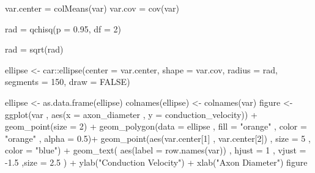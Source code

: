\documentclass[
]{article}
\newenvironment{Shaded}{\begin{snugshade}}{\end{snugshade}}
\newcommand{\AttributeTok}[1]{\textcolor[rgb]{0.77,0.63,0.00}{#1}}
\newcommand{\ConstantTok}[1]{\textcolor[rgb]{0.00,0.00,0.00}{#1}}
\newcommand{\DecValTok}[1]{\textcolor[rgb]{0.00,0.00,0.81}{#1}}
\newcommand{\FloatTok}[1]{\textcolor[rgb]{0.00,0.00,0.81}{#1}}
\newcommand{\FunctionTok}[1]{\textcolor[rgb]{0.00,0.00,0.00}{#1}}
\newcommand{\NormalTok}[1]{#1}
\newcommand{\OtherTok}[1]{\textcolor[rgb]{0.56,0.35,0.01}{#1}}
\newcommand{\SpecialCharTok}[1]{\textcolor[rgb]{0.00,0.00,0.00}{#1}}
\newcommand{\StringTok}[1]{\textcolor[rgb]{0.31,0.60,0.02}{#1}}
\begin{document}
\begin{Shaded}
\begin{Highlighting}[]
\NormalTok{var.center }\OtherTok{=} \FunctionTok{colMeans}\NormalTok{(var)}
\NormalTok{var.cov }\OtherTok{=} \FunctionTok{cov}\NormalTok{(var)}

\NormalTok{rad }\OtherTok{=} \FunctionTok{qchisq}\NormalTok{(}\AttributeTok{p =} \FloatTok{0.95}\NormalTok{, }\AttributeTok{df =} \DecValTok{2}\NormalTok{)}

\NormalTok{rad }\OtherTok{=} \FunctionTok{sqrt}\NormalTok{(rad)}

\NormalTok{ellipse }\OtherTok{\textless{}{-}}\NormalTok{ car}\SpecialCharTok{::}\FunctionTok{ellipse}\NormalTok{(}\AttributeTok{center =}\NormalTok{ var.center, }\AttributeTok{shape =}\NormalTok{ var.cov, }\AttributeTok{radius =}\NormalTok{ rad, }\AttributeTok{segments =} \DecValTok{150}\NormalTok{, }\AttributeTok{draw =} \ConstantTok{FALSE}\NormalTok{)}

\NormalTok{ellipse }\OtherTok{\textless{}{-}} \FunctionTok{as.data.frame}\NormalTok{(ellipse)}
\FunctionTok{colnames}\NormalTok{(ellipse) }\OtherTok{\textless{}{-}} \FunctionTok{colnames}\NormalTok{(var)}
\NormalTok{figure }\OtherTok{\textless{}{-}} \FunctionTok{ggplot}\NormalTok{(var , }\FunctionTok{aes}\NormalTok{(}\AttributeTok{x =}\NormalTok{ axon\_diameter , }\AttributeTok{y =}\NormalTok{ conduction\_velocity)) }\SpecialCharTok{+}
       \FunctionTok{geom\_point}\NormalTok{(}\AttributeTok{size =} \DecValTok{2}\NormalTok{) }\SpecialCharTok{+}
       \FunctionTok{geom\_polygon}\NormalTok{(}\AttributeTok{data =}\NormalTok{ ellipse , }\AttributeTok{fill =} \StringTok{"orange"}\NormalTok{ , }\AttributeTok{color =} \StringTok{"orange"}\NormalTok{ , }\AttributeTok{alpha =} \FloatTok{0.5}\NormalTok{)}\SpecialCharTok{+}
       \FunctionTok{geom\_point}\NormalTok{(}\FunctionTok{aes}\NormalTok{(var.center[}\DecValTok{1}\NormalTok{] , var.center[}\DecValTok{2}\NormalTok{]) , }\AttributeTok{size =} \DecValTok{5}\NormalTok{ , }\AttributeTok{color =} \StringTok{"blue"}\NormalTok{) }\SpecialCharTok{+}
       \FunctionTok{geom\_text}\NormalTok{( }\FunctionTok{aes}\NormalTok{(}\AttributeTok{label =} \FunctionTok{row.names}\NormalTok{(var)) , }\AttributeTok{hjust =} \DecValTok{1}\NormalTok{ , }\AttributeTok{vjust =} \SpecialCharTok{{-}}\FloatTok{1.5}\NormalTok{ ,}\AttributeTok{size =} \FloatTok{2.5}\NormalTok{ ) }\SpecialCharTok{+}
       \FunctionTok{ylab}\NormalTok{(}\StringTok{"Conduction Velocity"}\NormalTok{) }\SpecialCharTok{+} \FunctionTok{xlab}\NormalTok{(}\StringTok{"Axon Diameter"}\NormalTok{)}
\NormalTok{figure}
\end{Highlighting}
\end{Shaded}
\end{document}
